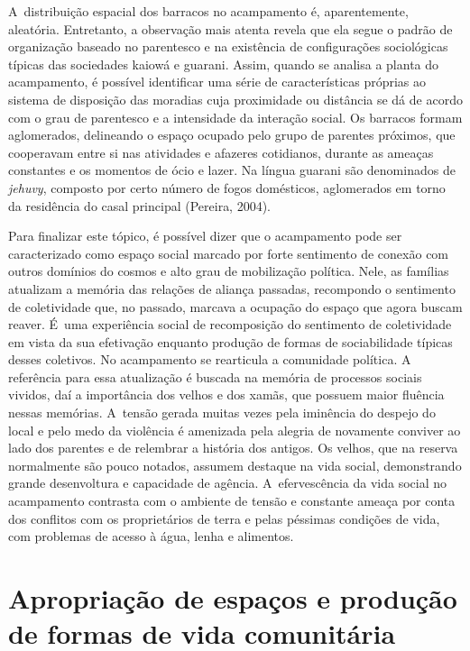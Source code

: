 A~distribuição espacial dos barracos no acampamento é, aparentemente,
aleatória. Entretanto, a observação mais atenta revela que ela segue o
padrão de organização baseado no parentesco e na existência de
configurações sociológicas típicas das sociedades kaiowá e guarani.
Assim, quando se analisa a planta do acampamento, é possível
identificar uma série de características próprias ao sistema de
disposição das moradias cuja proximidade ou distância se dá de acordo
com o grau de parentesco e a intensidade da interação social. Os
barracos formam aglomerados, delineando o espaço ocupado pelo grupo de
parentes próximos, que cooperavam entre si nas atividades e afazeres
cotidianos, durante as ameaças constantes e os momentos de ócio e
lazer. Na língua guarani são denominados de \emph{jehuvy}, composto por certo
número de fogos domésticos, aglomerados em torno da residência do casal
principal (Pereira, 2004).

Para finalizar este tópico, é possível dizer que o acampamento pode ser
caracterizado como espaço social marcado por forte sentimento de
conexão com outros domínios do cosmos e alto grau de mobilização
política. Nele, as famílias atualizam a memória das relações de aliança
passadas, recompondo o sentimento de coletividade que, no passado,
marcava a ocupação do espaço que agora buscam reaver. É~uma experiência
social de recomposição do sentimento de coletividade em vista da sua
efetivação enquanto produção de formas de sociabilidade típicas desses
coletivos. No acampamento se rearticula a comunidade política. A
referência para essa atualização é buscada na memória de processos
sociais vividos, daí a importância dos velhos e dos xamãs, que possuem
maior fluência nessas memórias. A~tensão gerada muitas vezes pela
iminência do despejo do local e pelo medo da violência é amenizada pela
alegria de novamente conviver ao lado dos parentes e de relembrar a
história dos antigos. Os velhos, que na reserva normalmente são pouco
notados, assumem destaque na vida social, demonstrando grande
desenvoltura e capacidade de agência. A~efervescência da vida social no
acampamento contrasta com o ambiente de tensão e constante ameaça por
conta dos conflitos com os proprietários de terra e pelas péssimas
condições de vida, com problemas de acesso à água, lenha e alimentos. 

\section{Apropriação de espaços e produção de formas de vida comunitária}

